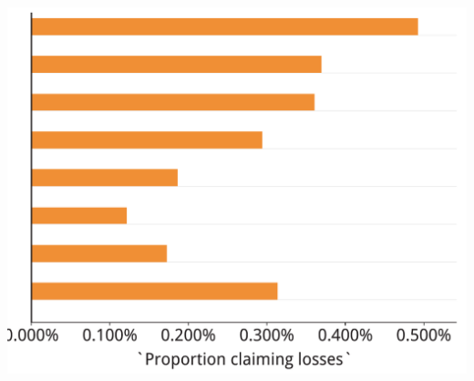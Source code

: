 \documentclass[tikz]{standalone}\usepackage[]{graphicx}\usepackage[]{color}
\newenvironment{knitrout}{}{} %
\begin{document}
\begin{knitrout}
\color{fgcolor}
\includegraphics[width=8.8in,height=7.00in]{./Hot-property-CG-and-NG/CGT-NG-atlas/b5-palatino-atlas/Proportions-PP-losses-1} 

\end{knitrout}
\end{document}
